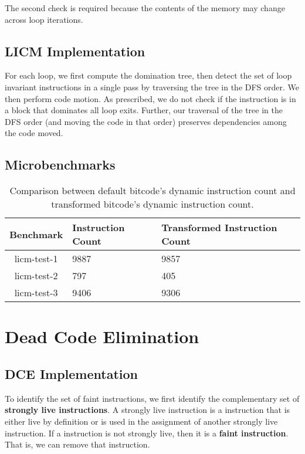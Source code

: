 The second check is required because the contents of the memory may change across loop iterations.

\subsection{LICM Implementation}

For each loop, we first compute the domination tree, then detect the set of loop invariant instructions in a single pass by traversing the tree in the DFS order. We then perform code motion. As prescribed, we do not check if the instruction is in a block that dominates all loop exits. Further, our traversal of the tree in the DFS order (and moving the code in that order) preserves dependencies among the code moved. 

\subsection{Microbenchmarks}

\begin{table}[!ht]
\centering
\begin{tabular}{c|l|l}
  \toprule
  \textbf{Benchmark} & \textbf{Instruction Count} & \textbf{Transformed Instruction Count} \\
  \midrule
  licm-test-1 & 9887 & 9857 \\ 
  licm-test-2 & 797  & 405 \\
  licm-test-3 & 9406 & 9306 \\ 
  \bottomrule
\end{tabular}
\caption{Comparison between default bitcode's dynamic instruction count and transformed
  bitcode's dynamic instruction count.}
\end{table}  


\section{Dead Code Elimination}

\subsection{DCE Implementation}

To identify the set of faint instructions, we first identify the complementary set of \textbf{strongly live instructions}.
A strongly live instruction is a instruction that is either live by definition or is used in the assignment of another
strongly live instruction.
If a instruction is not strongly live, then it is a \textbf{faint instruction}.
That is, we can remove that instruction.

